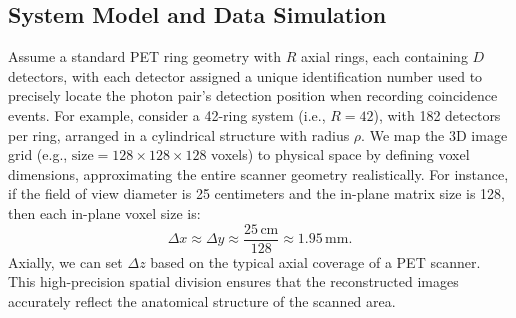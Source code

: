 \documentclass[
reprint,
superscriptaddress,
nofootinbib,
amsmath,amssymb,
aps,
prd,
]{revtex4-2}
\begin{document}
\subsection{System Model and Data Simulation}
Assume a standard PET ring geometry with \(R\) axial rings, each containing \(D\) detectors, with each detector assigned a unique identification number used to precisely locate the photon pair's detection position when recording coincidence events. For example, consider a 42-ring system (i.e., \(R=42\)), with 182 detectors per ring, arranged in a cylindrical structure with radius \(\rho\). We map the 3D image grid (e.g., \(\text{size}=128\times128\times128\) voxels) to physical space by defining voxel dimensions, approximating the entire scanner geometry realistically. For instance, if the field of view diameter is 25 centimeters and the in-plane matrix size is 128, then each in-plane voxel size is:
\begin{equation}
\Delta x \approx \Delta y \approx \frac{25\,\text{cm}}{128} \approx 1.95\,\text{mm}.
\end{equation}
Axially, we can set \(\Delta z\) based on the typical axial coverage of a PET scanner. This high-precision spatial division ensures that the reconstructed images accurately reflect the anatomical structure of the scanned area.
\end{document}
